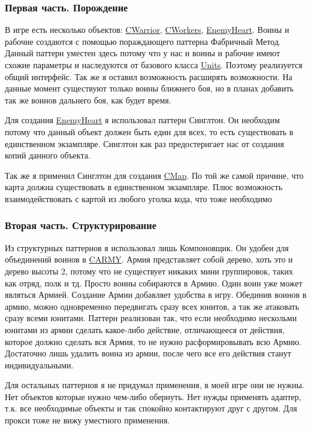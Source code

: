 \subsubsection*{Первая часть. Порождение}

В игре есть несколько объектов\+: \hyperlink{classCWarrior}{C\+Warrior}, \hyperlink{classCWorkers}{C\+Workers}, \hyperlink{classEnemyHeart}{Enemy\+Heart}. Воины и рабочие создаются с помощью пораждающего паттерна Фабричный Метод. Данный паттерн уместен здесь потому что у нас и воины и рабочие имеют схожие параметры и наследуются от базового класса \hyperlink{classUnits}{Units}. Поэтому реализуется общий интерфейс. Так же я оставил возможность расширять возможности. На данные момент существуют только воины ближнего боя, но в планах добавить так же воинов дальнего боя, как будет время.

Для создания \hyperlink{classEnemyHeart}{Enemy\+Heart} я использовал паттерн Синглтон. Он необходим потому что данный объект должен быть един для всех, то есть существовать в единственном экзампляре. Синглтон как раз предостеригает нас от создания копий данного объекта.

Так же я применил Синглтон для создания \hyperlink{classCMap}{C\+Map}. По той же самой причине, что карта должна существовать в единственном экзампляре. Плюс возможность взаимодействовать с картой из любого уголка кода, что тоже необходимо

\subsubsection*{Вторая часть. Структурирование}

Из структурных паттернов я использовал лишь Компоновщик. Он удобен для объединений воинов в \hyperlink{classCARMY}{C\+A\+R\+MY}. Армия представляет собой дерево, хоть это и дерево высоты 2, потому что не существует никаких мини группировок, таких как отряд, полк и тд. Просто воины собираются в Армию. Один воин уже может являться Армией. Создание Армии добавляет удобства в игру. Обединив воинов в армию, можно одновременно передвигать сразу всех юнитов, а так же атаковать сразу всеми юнитами. Паттерн реализован так, что если необходимо нескольми юнитами из армии сделать какое-\/либо действие, отличающееся от действия, которое должно сделать вся Армия, то не нужно расформировывать всю Армию. Достаточно лишь удалить воина из армии, после чего все его действия станут индивидуальными.

Для остальных паттернов я не придумал применения, в моей игре они не нужны. Нет объектов которые нужно чем-\/либо обернуть. Нет нужды применять адаптер, т.\+к. все необходимые объекты и так спокойно контактируют друг с другом. Для прокси тоже не вижу уместного применения.

